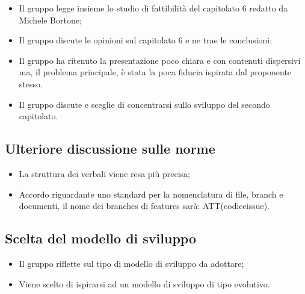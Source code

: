 \documentclass[11pt,a4paper]{article}
\begin{document}
\begin{itemize}
	\item Il gruppo legge insieme lo studio di fattibilità del capitolato 6 redatto da Michele Bortone;
	\item Il gruppo discute le opinioni sul capitolato 6 e ne trae le conclusioni;
	\item Il gruppo ha ritenuto la presentazione poco chiara e con contenuti dispersivi ma, il problema principale, è stata la poca fiducia ispirata dal proponente stesso. 
	\item Il gruppo discute e sceglie di concentrarsi sullo sviluppo del secondo capitolato.
	\end{itemize}

	\subsection{Ulteriore discussione sulle norme}
	\begin{itemize}
	\item La struttura dei verbali viene resa più precisa;
	\item Accordo riguardante uno standard per la nomenclatura di file, branch e documenti, il nome dei branches di features sarà: ATT(codiceissue).
	\end{itemize}
	\subsection{Scelta del modello di sviluppo}	
	\begin{itemize}
	\item Il gruppo riflette sul tipo di modello di sviluppo da adottare;
	\item Viene scelto di ispirarsi ad un modello di sviluppo di tipo evolutivo.
	\end{itemize}
\end{document}
